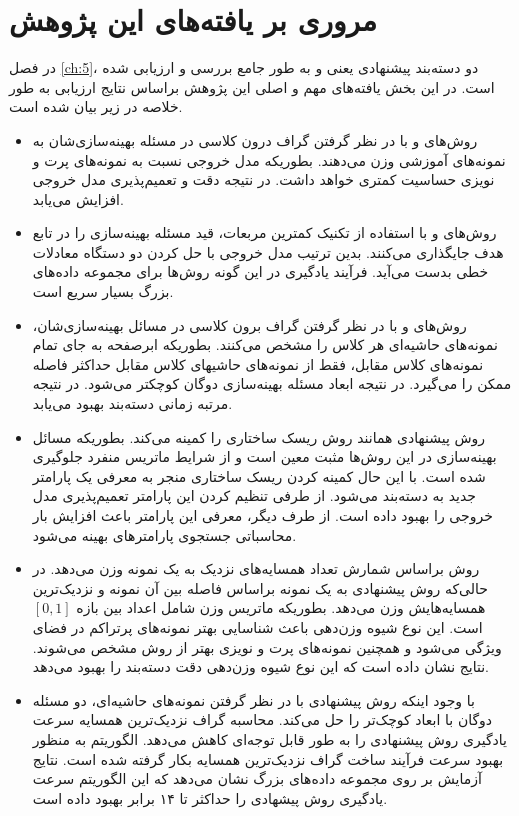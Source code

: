 \section{مروری بر یافته‌های این پژوهش}\label{sec:6:3}
در فصل \ref{ch:5}، دو دسته‌بند پیشنهادی یعنی  و  به طور جامع بررسی و ارزیابی شده است. در این بخش یافته‌های مهم و اصلی این پژوهش براساس نتایج ارزیابی به طور خلاصه در زیر بیان شده است.
\begin{itemize}[label=$\bullet$]
	\item روش‌های   و   با در نظر گرفتن گراف درون کلاسی در مسئله بهینه‌سازی‌شان به نمونه‌های آموزشی وزن می‌دهند. بطوریکه مدل خروجی نسبت به نمونه‌های پرت و نویزی حساسیت کمتری خواهد داشت. در نتیجه دقت و تعمیم‌پذیری مدل خروجی افزایش می‌یابد.
	\item روش‌های   و   با استفاده از تکنیک کمترین مربعات، قید مسئله بهینه‌سازی را در تابع هدف جایگذاری می‌کنند. بدین ترتیب مدل خروجی با حل کردن دو دستگاه معادلات خطی بدست می‌آید. فرآیند یادگیری در این گونه روش‌ها برای مجموعه داده‌های بزرگ بسیار سریع است.
	\item روش‌های  و   با در نظر گرفتن گراف برون کلاسی در مسائل بهینه‌سازی‌شان، نمونه‌های حاشیه‌ای هر کلاس را مشخص می‌کنند. بطوریکه ابرصفحه به جای تمام نمونه‌های کلاس مقابل، فقط از نمونه‌های حاشیها‌‌‌ی کلاس مقابل حداکثر فاصله ممکن را می‌گیرد. در نتیجه ابعاد مسئله بهینه‌سازی دوگان کوچکتر می‌شود. در نتیجه مرتبه زمانی دسته‌بند بهبود می‌یابد.
	\item روش پیشنهادی   همانند روش   ریسک ساختاری را کمینه می‌کند. بطوریکه مسائل بهینه‌سازی در این  روش‌ها مثبت معین است و از شرایط ماتریس منفرد جلوگیری شده است. با این حال کمینه کردن ریسک ساختاری منجر به معرفی یک پارامتر جدید به دسته‌بند می‌شود. از طرفی تنظیم کردن این پارامتر تعمیم‌پذیری مدل خروجی را بهبود داده است. از طرف دیگر، معرفی این پارامتر باعث افزایش بار محاسباتی جستجوی پارامترهای بهینه می‌شود. 
	\item روش   براساس شمارش تعداد همسایه‌های نزدیک به یک نمونه وزن می‌دهد. در حالی‌که روش پیشنهادی   به یک نمونه براساس فاصله بین آن نمونه و نزدیک‌ترین همسایه‌هایش وزن می‌دهد. بطوریکه ماتریس وزن شامل اعداد بین بازه   $\left[0,1\right]$ است. این نوع شیوه وزن‌دهی باعث شناسایی بهتر نمونه‌های پرتراکم در فضای ویژگی می‌شود و همچنین نمونه‌های پرت و نویزی بهتر از روش  مشخص می‌شوند. نتایج نشان داده است که این نوع شیوه وزن‌دهی دقت دسته‌بند  را بهبود می‌دهد.
	\item با وجود اینکه روش پیشنهادی    با در نظر گرفتن نمونه‌های حاشیه‌ای، دو مسئله دوگان با ابعاد کوچک‌تر را حل می‌کند. محاسبه گراف نزدیک‌ترین همسایه سرعت یادگیری روش پیشنهادی را به طور قابل توجه‌ای کاهش می‌دهد. الگوریتم   به منظور بهبود سرعت فرآیند ساخت گراف نزدیک‌ترین همسایه بکار گرفته شده است. نتایج آزمایش بر روی مجموعه داده‌های بزرگ نشان می‌دهد که این الگوریتم سرعت یادگیری روش پیشهادی را حداکثر تا ۱۴ برابر بهبود داده است.
\end{itemize}

